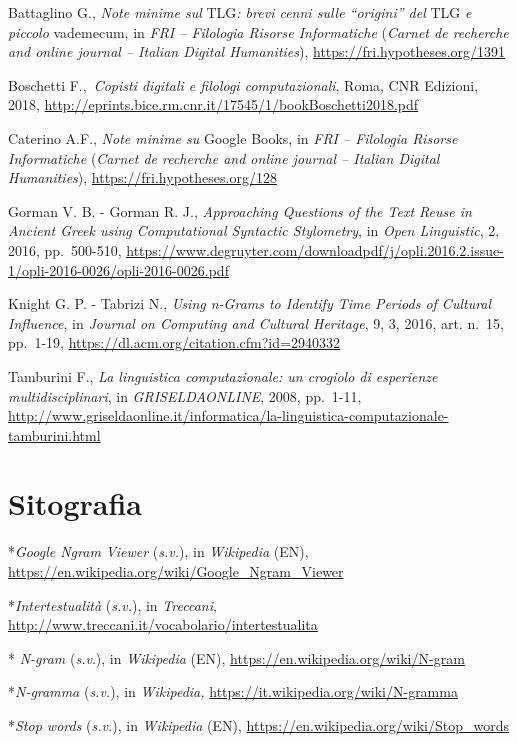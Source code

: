 \documentclass[
  b5paper,
  twoside,
  12pt,
  chapterprefix=false,
  bibliography=totocnumbered,
  parskip=false]{scrbook}
\begin{document}
Battaglino G., \emph{Note minime sul} TLG\emph{: brevi cenni sulle \enquote{origini} del}
TLG \emph{e piccolo} vademecum, in \emph{FRI -- Filologia Risorse Informatiche}
(\emph{Carnet de recherche and online journal -- Italian Digital
Humanities}),
\url{https://fri.hypotheses.org/1391}

Boschetti F.,~\emph{Copisti digitali e filologi computazionali}, Roma, CNR
Edizioni, 2018,
\url{http://eprints.bice.rm.cnr.it/17545/1/bookBoschetti2018.pdf}

Caterino A.F., \emph{Note minime su} Google Books, in \emph{FRI -- Filologia
Risorse Informatiche} (\emph{Carnet de recherche and online journal --
Italian Digital Humanities}),
\url{https://fri.hypotheses.org/128}

Gorman V. B. - Gorman R. J., \emph{Approaching Questions of the Text Reuse in
Ancient Greek using Computational Syntactic Stylometry}, in \emph{Open
Linguistic}, 2, 2016, pp.~500-510,
\url{https://www.degruyter.com/downloadpdf/j/opli.2016.2.issue-1/opli-2016-0026/opli-2016-0026.pdf}

Knight G. P. - Tabrizi N., \emph{Using n-Grams to Identify Time Periods of
Cultural Influence}, in \emph{Journal on Computing and Cultural Heritage}, 9,
3, 2016, art. n.~15, pp.~1-19,
\url{https://dl.acm.org/citation.cfm?id=2940332}

Tamburini F., \emph{La linguistica computazionale: un crogiolo di esperienze
multidisciplinari}, in \emph{GRISELDAONLINE}, 2008, pp.~1-11,
\url{http://www.griseldaonline.it/informatica/la-linguistica-computazionale-tamburini.html}

\hypertarget{sitografia-23}{%
\section*{Sitografia}\label{sitografia-23}}

*\emph{Google Ngram Viewer} (\emph{s.v.}), in \emph{Wikipedia} (EN),
\url{https://en.wikipedia.org/wiki/Google_Ngram_Viewer}

*\emph{Intertestualità} (\emph{s.v.}), in \emph{Treccani},
\url{http://www.treccani.it/vocabolario/intertestualita}

* \emph{N-gram} (\emph{s.v}.), in \emph{Wikipedia} (EN),
\url{https://en.wikipedia.org/wiki/N-gram}

*\emph{N-gramma} (\emph{s.v.}), in \emph{Wikipedia,}
\url{https://it.wikipedia.org/wiki/N-gramma}

*\emph{Stop words} (\emph{s.v.}), in \emph{Wikipedia} (EN),
\url{https://en.wikipedia.org/wiki/Stop_words}
\end{document}
